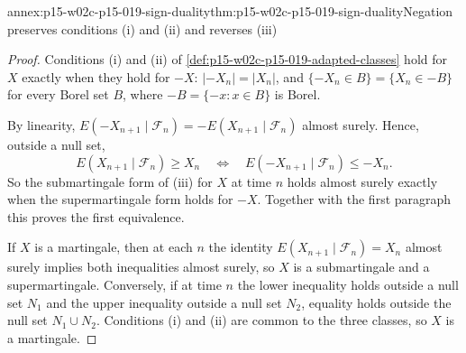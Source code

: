 \begin{annexitem}{annex:p15-w02c-p15-019-sign-duality}{thm:p15-w02c-p15-019-sign-duality}{Negation preserves conditions (i) and (ii) and reverses (iii)}
\begin{proof}
Conditions (i) and (ii) of \cref{def:p15-w02c-p15-019-adapted-classes}
hold for \(X\) exactly when they hold for \(-X\): \(|-X_n|=|X_n|\), and
\(\{-X_n\in B\}=\{X_n\in-B\}\) for every Borel set \(B\), where
\(-B=\{-x:x\in B\}\) is Borel.

By linearity, \(E(-X_{n+1}\mid\mathcal F_n)=-E(X_{n+1}\mid\mathcal F_n)\)
almost surely. Hence, outside a null set,
\[
 E(X_{n+1}\mid\mathcal F_n)\geq X_n
 \quad\Longleftrightarrow\quad
 E(-X_{n+1}\mid\mathcal F_n)\leq -X_n .
\]
So the submartingale form of (iii) for \(X\) at time \(n\) holds almost
surely exactly when the supermartingale form holds for \(-X\). Together
with the first paragraph this proves the first equivalence.

If \(X\) is a martingale, then at each \(n\) the identity
\(E(X_{n+1}\mid\mathcal F_n)=X_n\) almost surely implies both
inequalities almost surely, so \(X\) is a submartingale and a
supermartingale. Conversely, if at time \(n\) the lower inequality holds
outside a null set \(N_1\) and the upper inequality outside a null set
\(N_2\), equality holds outside the null set \(N_1\cup N_2\). Conditions
(i) and (ii) are common to the three classes, so \(X\) is a martingale.
\end{proof}
\end{annexitem}

